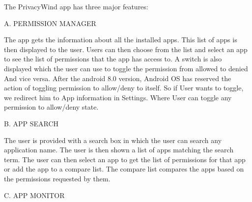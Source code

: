 \documentclass[12pt]{report}
\renewcommand{\_}{\kern-1.5pt\textunderscore\kern-1.5pt}
\begin{document}
\begin{multicols}{2}
\vspace{\baselineskip}
\begin{justify}
{\fontsize{10pt}{12.0pt}\selectfont The PrivacyWind app has three major features:}
\end{justify}

\vspace{\baselineskip}
\begin{justify}
{\fontsize{10pt}{12.0pt}\selectfont A. PERMISSION MANAGER}
\end{justify}
\begin{justify}
{\fontsize{10pt}{12.0pt}\selectfont \tab The app gets the information about all the installed apps. This list of apps is then displayed to the user. Users can then choose from the list and select an app to see the list of permissions that the app has access to. A switch is also displayed which the user can use to toggle the permission from allowed to denied And vice versa. After the android 8.0 version, Android OS has reserved the action of toggling permission to allow/deny to itself. So if User wants to toggle, we redirect him to App information in Settings. Where User can toggle any permission to allow/deny state. \par}
\end{justify}

\vspace{\baselineskip}
\begin{justify}
{\fontsize{10pt}{12.0pt}\selectfont B. APP SEARCH}
\end{justify}
\begin{justify}
{\fontsize{10pt}{12.0pt}\selectfont \tab The user is provided with a search box in which the user can search any application name. The user is then shown a list of apps matching the search term. The user can then select an app to get the list of permissions for that app or add the app to a compare list. The compare list compares the apps based on the permissions requested by them.\par}
\end{justify}

\vspace{\baselineskip}
\begin{justify}
{\fontsize{10pt}{12.0pt}\selectfont C. APP MONITOR}
\end{justify}
\begin{justify}
\end{justify}


\end{multicols}
\end{document}

